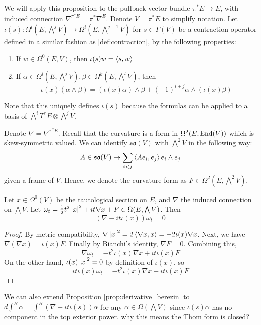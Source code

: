 We will apply this proposition to the pullback vector bundle $\pi^*E \to E$, 
with induced connection $\nabla^{\pi^*E}=\pi^*\nabla^E$. Denote $V=\pi^*E$ to
simplify notation.
Let $\iota(s):\Omega^i(E,\bigwedge^j V) \to
\Omega^i(E,\bigwedge^{j-1} V)$ for $s\in\Gamma(V)$ be a contraction operator
defined in a similar fashion as \ref{def:contraction}, by the following
properties:
\begin{enumerate}[(1)]
    \item If $w\in \Omega^0(E,V)$, then  $\iota(s)w = \gen{s,w}$
	\item If $\alpha\in\Omega^i(E,\bigwedge^jV),
		\beta\in\Omega^k(E,\bigwedge^lV)$, then 
	 \[
	\iota(x)(\alpha\wedge \beta) 
	= (\iota(x)\alpha)\wedge\beta + (-1)^{i+j}\alpha\wedge(\iota(x)\beta)
	\] 
\end{enumerate}
Note that this uniquely defines $\iota(s)$ because the formulas can be applied
to a basis of $\bigwedge^iT^*E\otimes \bigwedge^jV$.

Denote $\nabla = \nabla^{\pi^*E}$. 
Recall that the curvature is a form in $\Omega^2(E,\operatorname{End}(V))$ 
which is skew-symmetric valued. We can identify $\mathfrak{so}(V)$ with 
$\bigwedge^2 V$ in the following way:
\[
	A\in \mathfrak{so}(V) \mapsto \sum_{i<j} \gen{Ae_i,e_j} e_i\wedge e_j
\] 
given a frame of $V$. Hence, we denote the curvature form as $F \in
\Omega^2(E,\bigwedge^2V)$.

\begin{lem} %
	Let $x \in \Omega^0(V)$ be the tautological section on $E$, and $\nabla$ the
	induced connection on $\bigwedge V$.
	Let $\omega_t = \frac{1}{2}t^2\abs{x}^2 + it\nabla x + F 
	\in \Omega(E,\bigwedge V)$. Then 
	\[
		(\nabla - it\iota(x))\omega_t = 0
	\] 
\end{lem}
\begin{proof}
	 By metric compatibility,
	$\nabla \abs{x}^2 = 2\gen{\nabla x, x} = -2\iota(x)\nabla x$.
	Next, we have $\nabla(\nabla x) = \iota(x) F$.
	Finally by Bianchi's identity, $\nabla F = 0$. Combining this,
	\[
	\nabla \omega_t = -t^2\iota(x) \nabla x + it\iota(x)F 
	\] 
	On the other hand, $\iota(x)\abs{x}^2 = 0$ by definition of $\iota(x)$, so
	\[
	it\iota(x)\omega_t = -t^2\iota(x) \nabla x + it\iota(x)F
	\] 
\end{proof}
We can also extend Proposition \ref{prop:derivative_berezin} to 
$d\int^B\alpha = \int^B (\nabla-it\iota(s))\alpha$ for any
$\alpha\in\Omega(\bigwedge V)$ since $\iota(s)\alpha$ has no component in the top exterior power.
why this means the Thom form is closed?

